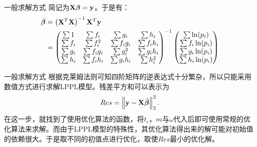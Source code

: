 \begin{frame}[t]{一般求解方式}
    简记为$\mathbf{X}\bm{\beta} = \mathbf{y}$。于是有：
    \begin{align*}
        \hat{\bm{\beta}} &= \left(\mathbf{X}^T\mathbf{X}\right)^{-1}\mathbf{X}^T\mathbf{y} \\
                    &=
        \begin{pmatrix}
            \sum 1   & \sum f_i    & \sum g_i    & \sum h_i    \\
            \sum f_i & \sum f_i^2  & \sum f_ig_i & \sum f_ih_i \\
            \sum g_i & \sum f_ig_i & \sum g_i^2  & \sum g_ih_i \\
            \sum h_i & \sum f_ih_i & \sum g_ih_i & \sum h_i^2  \\
        \end{pmatrix}^{-1}
        \begin{pmatrix}
            \sum \ln(p_i)    \\
            \sum f_i\ln(p_i) \\
            \sum g_i\ln(p_i) \\
            \sum h_i\ln(p_i) \\
        \end{pmatrix}
    \end{align*}
\end{frame}


\begin{frame}[t]{一般求解方式}
    根据克莱姆法则可知四阶矩阵的逆表达式十分繁杂，所以只能采用数值方式进行求解LPPL模型。残差平方和可以表示为
    \begin{equation*}
        Res = \left\|\mathbf{y}-\mathbf{X}\hat{\bm{\beta}}\right\|_2^2.
    \end{equation*}
    在这一步，就找到了使用优化算法的函数，将$t_c$，$m$与$\omega$代入后即可使用常规的优化算法来求解。而由于LPPL模型的特殊性，其优化算法得出来的解可能对初始值的依赖很大。于是取不同的初值点进行优化，取使$Res$最小的优化解。
\end{frame}


